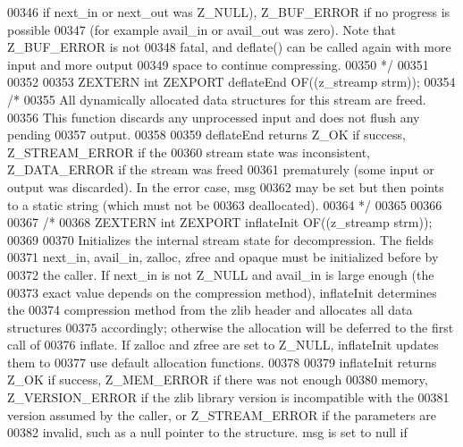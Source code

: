 \begin{DoxyCode}
00346 \textcolor{comment}{  if next\_in or next\_out was Z\_NULL), Z\_BUF\_ERROR if no progress is possible}
00347 \textcolor{comment}{  (for example avail\_in or avail\_out was zero).  Note that Z\_BUF\_ERROR is not}
00348 \textcolor{comment}{  fatal, and deflate() can be called again with more input and more output}
00349 \textcolor{comment}{  space to continue compressing.}
00350 \textcolor{comment}{*/}
00351 
00352 
00353 ZEXTERN \textcolor{keywordtype}{int} ZEXPORT deflateEnd OF((z\_streamp strm));
00354 \textcolor{comment}{/*}
00355 \textcolor{comment}{     All dynamically allocated data structures for this stream are freed.}
00356 \textcolor{comment}{   This function discards any unprocessed input and does not flush any pending}
00357 \textcolor{comment}{   output.}
00358 \textcolor{comment}{}
00359 \textcolor{comment}{     deflateEnd returns Z\_OK if success, Z\_STREAM\_ERROR if the}
00360 \textcolor{comment}{   stream state was inconsistent, Z\_DATA\_ERROR if the stream was freed}
00361 \textcolor{comment}{   prematurely (some input or output was discarded).  In the error case, msg}
00362 \textcolor{comment}{   may be set but then points to a static string (which must not be}
00363 \textcolor{comment}{   deallocated).}
00364 \textcolor{comment}{*/}
00365 
00366 
00367 \textcolor{comment}{/*}
00368 \textcolor{comment}{ZEXTERN int ZEXPORT inflateInit OF((z\_streamp strm));}
00369 \textcolor{comment}{}
00370 \textcolor{comment}{     Initializes the internal stream state for decompression.  The fields}
00371 \textcolor{comment}{   next\_in, avail\_in, zalloc, zfree and opaque must be initialized before by}
00372 \textcolor{comment}{   the caller.  If next\_in is not Z\_NULL and avail\_in is large enough (the}
00373 \textcolor{comment}{   exact value depends on the compression method), inflateInit determines the}
00374 \textcolor{comment}{   compression method from the zlib header and allocates all data structures}
00375 \textcolor{comment}{   accordingly; otherwise the allocation will be deferred to the first call of}
00376 \textcolor{comment}{   inflate.  If zalloc and zfree are set to Z\_NULL, inflateInit updates them to}
00377 \textcolor{comment}{   use default allocation functions.}
00378 \textcolor{comment}{}
00379 \textcolor{comment}{     inflateInit returns Z\_OK if success, Z\_MEM\_ERROR if there was not enough}
00380 \textcolor{comment}{   memory, Z\_VERSION\_ERROR if the zlib library version is incompatible with the}
00381 \textcolor{comment}{   version assumed by the caller, or Z\_STREAM\_ERROR if the parameters are}
00382 \textcolor{comment}{   invalid, such as a null pointer to the structure.  msg is set to null if}

\end{DoxyCode}
